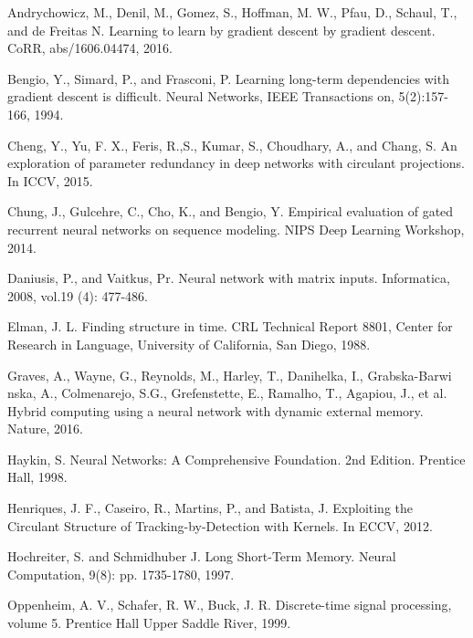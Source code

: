\documentclass[a4paper,11pt]{article}
\begin{document}
\begin{thebibliography}{1}



 Andrychowicz, M.,  Denil, M., Gomez, S., Hoffman, M. W., Pfau, D., Schaul, T., and de Freitas N.  Learning to learn by gradient descent by gradient descent. CoRR, abs/1606.04474, 2016.

 Bengio,  Y.,  Simard,  P.,  and  Frasconi, P. Learning long-term dependencies with gradient descent is difficult. Neural Networks, IEEE Transactions on, 5(2):157-166, 1994.

 Cheng, Y., Yu, F. X., Feris, R.,S., Kumar, S., Choudhary, A., and Chang, S.  An exploration of parameter redundancy in deep networks with circulant projections. In
ICCV, 2015.


 Chung, J., Gulcehre, C., Cho, K., and Bengio, Y. Empirical evaluation of gated recurrent neural networks on sequence modeling. NIPS Deep Learning Workshop, 2014.

 Daniusis, P., and Vaitkus, Pr. Neural network with matrix inputs. Informatica, 2008, vol.19 (4): 477-486.


 Elman, J. L. Finding structure in time.  CRL Technical Report 8801, Center for Research in Language, University
of California, San Diego, 1988.

  Graves, A., Wayne, G., Reynolds, M.,  Harley, T., Danihelka, I., Grabska-Barwi
 nska, A., Colmenarejo, S.G., Grefenstette, E., Ramalho, T., Agapiou, J., et al. Hybrid computing using a neural network with dynamic external memory. Nature, 2016.



 Haykin, S. Neural Networks: A Comprehensive Foundation. 2nd Edition. Prentice Hall, 1998.


 Henriques,  J. F.,  Caseiro, R.,  Martins, P.,  and Batista, J.   Exploiting the Circulant Structure of Tracking-by-Detection with Kernels.   In ECCV, 2012.


 Hochreiter, S.  and  Schmidhuber J. Long  Short-Term  Memory. Neural  Computation, 9(8): pp. 1735-1780, 1997.





 Oppenheim,  A.  V.,  Schafer, R. W.,  Buck,  J. R. Discrete-time signal processing, volume 5.  Prentice Hall Upper Saddle River, 1999.


\end{thebibliography}
\end{document}
